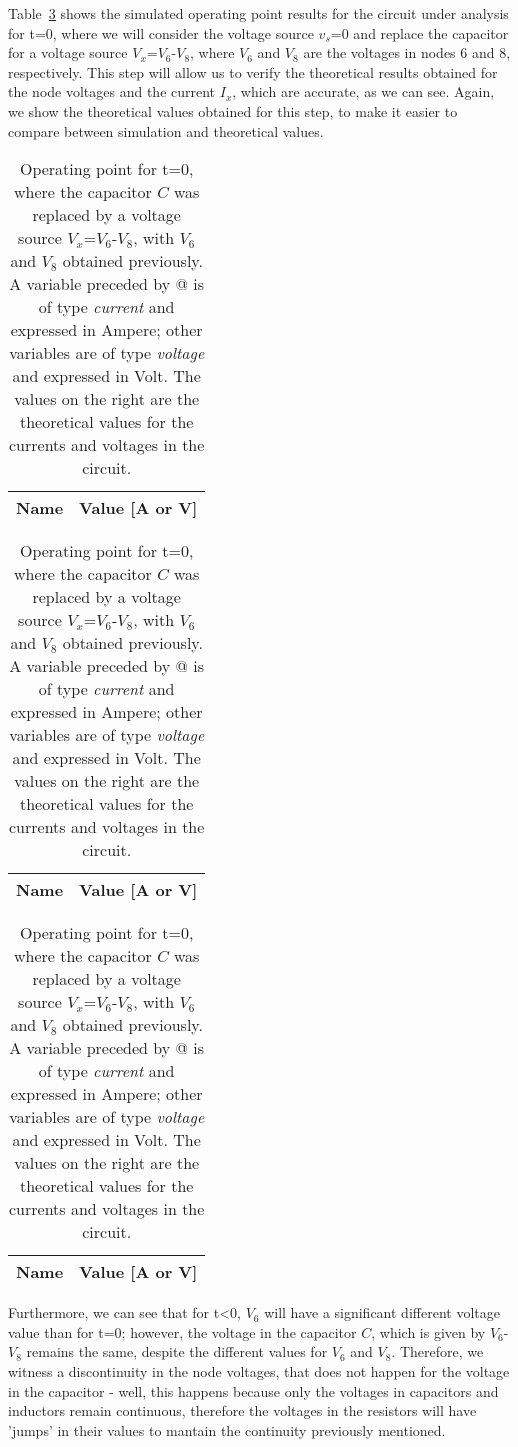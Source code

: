 	Table~\ref{tab2:op} shows the simulated operating point results for the circuit
under analysis for t=0, where we will consider the voltage source $v_s$=0 and replace the
capacitor for a voltage source $V_x$=$V_6$-$V_8$, where $V_6$ and $V_8$ are the voltages in
nodes 6 and 8, respectively. This step will allow us to verify the theoretical results obtained 
for the node voltages and the current $I_x$, which are accurate, as we can see. Again, we show
the theoretical values obtained for this step, to make it easier to compare between simulation
and theoretical values.



\begin{table}[h]
  \centering
  \begin{tabular}{|l|r|}
    \hline    
    {\bf Name} & {\bf Value [A or V]} \\ \hline
    
  \end{tabular}
  \begin{tabular}{|l|r|}
    \hline    
    {\bf Name} & {\bf Value [A or V]} \\ \hline
    
  \end{tabular}
  \begin{tabular}{|l|r|}
    \hline    
    {\bf Name} & {\bf Value [A or V]} \\ \hline
    
  \end{tabular}
  \caption{Operating point for t=0, where the capacitor $C$ was replaced by a voltage source $V_x$=$V_6$-$V_8$, with $V_6$ and $V_8$ obtained previously. 
  A variable preceded by @ is of type {\em current} and expressed in Ampere; other variables are of type {\it voltage} and expressed in Volt. The values on the right are the theoretical 
  values for the currents and voltages in the circuit.}
  \label{tab2:op}
\end{table}


Furthermore, we can see that for t<0, $V_6$ will have a significant different voltage value than for t=0; however, the voltage in the capacitor $C$,
which is given by $V_6$-$V_8$ remains the same, despite the different values for $V_6$ and $V_8$. Therefore, we witness a discontinuity in the node voltages,
that does not happen for the voltage in the capacitor - well, this happens because only the voltages in capacitors and inductors remain continuous, therefore 
the voltages in the resistors will have 'jumps' in their values to mantain the continuity previously mentioned. 


